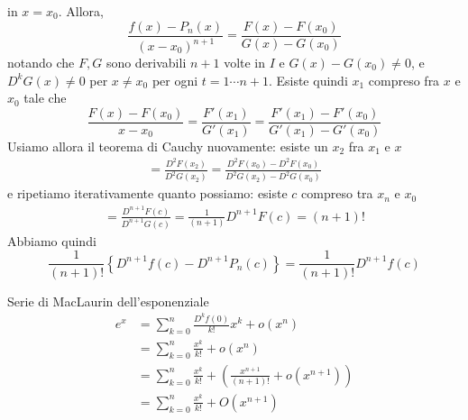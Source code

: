 \documentclass[a4paper]{article}
\begin{document}
\begin{radioactive}
\begin{snippetproof}{}
\begin{enumerate}
        in \(x=x_0\).
        Allora,
        \[
            \frac{f(x) - P_n(x)}{{(x-x_0)}^{n+1}} = \frac{F(x) - F(x_0)}{G(x) - G(x_0)}
        \]
        notando che \(F,G\) sono derivabili \(n+1\) volte in \(I\)
        e \(G(x) - G(x_0) \neq 0\), e \(D^k G(x) \neq 0\) per \(x\neq x_0\)
        per ogni \(t = 1 \cdots n+1\).
        Esiste quindi \(x_1\) compreso fra \(x\) e \(x_0\) tale che
        \[
            \frac{F(x) - F(x_0)}{x-x_0} = \frac{F'(x_1)}{G'(x_1)}
            = \frac{F'(x_1) - F'(x_0)}{G'(x_1) - G'(x_0)}
        \]
        Usiamo allora il teorema di Cauchy nuovamente: esiste un \(x_2\)
        fra \(x_1\) e \(x\)
        \begin{align*}
            = \frac{D^2 F(x_2)}{D^2 G(x_2)} = \frac{D^2 F(x_0) - D^2 F(x_0)}{D^2 G(x_2) - D^2 G(x_0)}
        \end{align*}
        e ripetiamo iterativamente quanto possiamo: esiste \(c\)
        compreso tra \(x_n\) e \(x_0\)
        \begin{align*}
            = \frac{D^{n+1} F(c)}{D^{n+1} G(c)}
            = \frac{1}{(n+1)} D^{n+1}F(c) = (n+1)!
        \end{align*}
        Abbiamo quindi
        \[
            \frac{1}{(n+1)!} \left\{
                D^{n+1}f(c) - D^{n+1}P_n(c)
            \right\} = \frac{1}{(n+1)!} D^{n+1}f(c)
        \]
    \end{enumerate}
\end{snippetproof}
\end{radioactive}

\begin{snippetproposition}{Serie di MacLaurin dell'esponenziale}
    \begin{align*}
        e^x &= \sum_{k=0}^n \frac{D^kf(0)}{k!} x^k + o(x^n) \\
        &= \sum_{k=0}^n \frac{x^k}{k!} + o(x^n) \\
        &= \sum_{k=0}^n\frac{x^k}{k!} + \left(\frac{x^{n+1}}{(n+1)!} + o(x^{n+1})\right) \\
        &= \sum_{k=0}^n\frac{x^k}{k!} + O(x^{n+1})
    \end{align*}
\end{snippetproposition}
\end{document}
